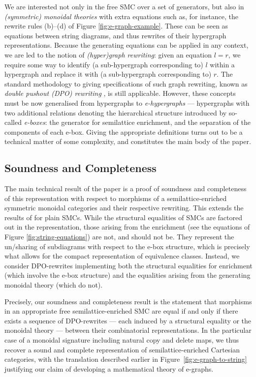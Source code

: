 We are interested not only in the free SMC over a set of generators, but also in \textit{(symmetric) monoidal theories} with extra equations such as, for instance, the rewrite rules (b)--(d) of Figure \ref{fig:e-graph-example}. These can be seen as equations between string diagrams, and thus rewrites of their hypergraph representations.  Because the generating equations can be applied in any context, we are led to the notion of \textit{(hyper)graph rewriting}: given an equation $l=r$, we require some way to identify (a sub-hypergraph corresponding to) $l$ within a hypergraph and replace it with (a sub-hypergraph corresponding to) $r$.
The standard methodology to giving specifications of such graph rewriting, known as \textit{double pushout (DPO) rewriting} \cite{dpo, bonchi_string_2022}, is still applicable.
However, these concepts must be now generalised from hypergraphs to \textit{e-hypergraphs} --- hypergraphs with two additional relations denoting the hierarchical structure introduced by so-called \textit{e-boxes}: the generator for semilattice enrichment, and the separation of the components of each e-box.
Giving the appropriate definitions turns out to be a technical matter of some complexity, and constitutes the main body of the paper. 

\subsection{Soundness and Completeness}
The main technical result of the paper is a proof of soundness and completeness of this representation with respect to morphisms of a semilattice-enriched symmetric monoidal categories and their respective rewriting.
This extends the results of \cite{bonchi_string_2022-2} for plain SMCs. 
While the structural equalities of SMCs are factored out in the representation,  those arising from the enrichment (see the equations of Figure \ref{fig:string-equations}) are not, and should not be. 
They represent the un/sharing of subdiagrams with respect to the e-box structure,  which is precisely what allows for the compact representation of equivalence classes.  
Instead, we consider DPO-rewrites implementing both the structural equalities for enrichment (which involve the e-box structure) and the equalities arising from the generating monoidal theory (which do not).  

Precisely,  our soundness and completeness result is the statement that morphisms in an appropriate free semilattice-enriched SMC are equal  if and only if there exists a sequence of DPO-rewrites --- each induced by a structural equality or the monoidal theory --- between their combinatorial representations. 
In the particular case of a monoidal signature including natural copy and delete maps,  we thus recover a sound and complete representation of semilattice-enriched Cartesian categories,  with the translation described earlier in Figure~\ref{fig:e-graph-to-string} justifying our claim of developing a mathematical theory of e-graphs. 

